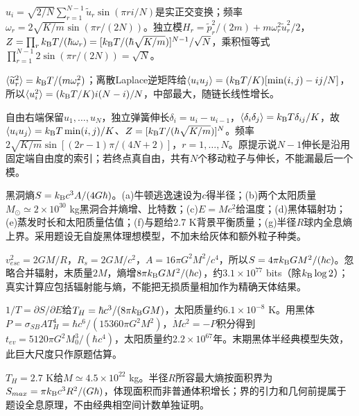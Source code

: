 \begin{solution}
$u_i=\sqrt{2/N}\sum_{r=1}^{N-1}\widetilde u_r\sin(\pi ri/N)$是实正交变换；频率$\omega_r=2\sqrt{K/m}\sin(\pi r/(2N))$。独立模$H_r=\widetilde p_r^2/(2m)+m\omega_r^2\widetilde u_r^2/2$，$Z=\prod_rk_{\mathrm B} T/(\hbar\omega_r)=[k_{\mathrm B} T/(\hbar\sqrt{K/m})]^{N-1}/\sqrt N$，乘积恒等式$\prod_{r=1}^{N-1}2\sin(\pi r/(2N))=\sqrt N$。

$\langle \widetilde u_r^2\rangle=k_{\mathrm B} T/(m\omega_r^2)$；离散Laplace逆矩阵给$\langle u_iu_j\rangle=(k_{\mathrm B} T/K)[\min(i,j)-ij/N]$，所以$\langle u_i^2\rangle=(k_{\mathrm B} T/K)i(N-i)/N$，中部最大，随链长线性增长。
\begin{center}\end{center}
自由右端保留$u_1,\ldots,u_N$，独立弹簧伸长$\delta_i=u_i-u_{i-1}$，$\langle \delta_i\delta_j\rangle=k_{\mathrm B} T\delta_{ij}/K$，故$\langle u_iu_j\rangle=k_{\mathrm B} T\min(i,j)/K$、$Z=[k_{\mathrm B} T/(\hbar\sqrt{K/m})]^N$。频率$2\sqrt{K/m}\sin[(2r-1)\pi/(4N+2)]$，$r=1,\ldots,N$。原提示说$N-1$伸长是沿用固定端自由度的索引；若终点真自由，共有$N$个移动粒子与伸长，不能漏最后一个模。
\end{solution}
\begin{exercise}[原题7(a)--(g)]\label{r:333-3-7}
黑洞熵$S=k_{\mathrm B} c^3A/(4G\hbar)$。(a)牛顿逃逸速设为$c$得半径；(b)两个太阳质量$M_\odot\simeq2\times10^{30}$ kg黑洞合并熵增、比特数；(c)$E=Mc^2$给温度；(d)黑体辐射功；(e)蒸发时长和太阳质量估值；(f)与题给2.7 K背景平衡质量；(g)半径$R$球内全息熵上界。采用题设无自旋黑体理想模型，不加未给灰体和额外粒子种类。
\end{exercise}
\begin{solution}
$v_{esc}^2=2GM/R$，$R_s=2GM/c^2$，$A=16\pi G^2M^2/c^4$，所以$S=4\pi k_{\mathrm B} GM^2/(\hbar c)$。忽略合并辐射，末质量$2M$，熵增$8\pi k_{\mathrm B} GM^2/(\hbar c)$，约$3.1\times10^{77}$ bits（除$k_{\mathrm B}\log2$）；真实计算应包括辐射能与熵，不能把无损质量相加作为精确天体结果。

$1/T=\partial S/\partial E$给$T_H=\hbar c^3/(8\pi k_{\mathrm B} GM)$，太阳质量约$6.1\times10^{-8}$ K。用黑体$P=\sigma_{SB}AT_H^4=\hbar c^6/(15360\pi G^2M^2)$，$\dot Mc^2=-P$积分得到$t_{ev}=5120\pi G^2M_0^3/(\hbar c^4)$，太阳质量约$2.2\times10^{67}$年。末期黑体半经典模型失效，此巨大尺度只作原题估算。

$T_H=2.7$ K给$M\simeq4.5\times10^{22}$ kg。半径$R$所容最大熵按面积界为$S_{max}=\pi k_{\mathrm B} c^3R^2/(G\hbar)$，体现面积而非普通体积增长；界的引力和几何前提属于题设全息原理，不由经典相空间计数单独证明。
\end{solution}
